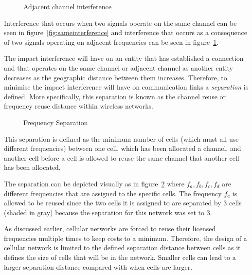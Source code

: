 \begin{figure}[bp!]
	\begin{centering}
	
	\label{fig:adjacentinterference}
	\caption{Adjacent channel interference}
	\end{centering}
\end{figure}
Interference that occurs when two signals operate on the same channel can be seen in figure~\ref{fig:sameinterference} and interference that occurs as a consequence of two signals operating on adjacent frequencies can be seen in figure~\ref{fig:adjacentinterference}.

The impact interference will have on an entity that has established a connection and that operates on the same channel or adjacent channel as another entity decreases as the geographic distance between them increases\cite{InterferenceOrientatedFAP}. Therefore, to minimise the impact interference will have on communication links a \emph{separation} is defined\cite{WirelessCommunications}. More specifically, this separation is known as the channel reuse or frequency reuse distance within wireless networks\cite{WirelessCommunications}.

\begin{figure}[t!]
	\begin{centering}
	
	\caption{Frequency Separation}
	\label{fig:seperationgraph}
	\end{centering}
\end{figure}

This separation is defined as the minimum number of cells (which must all use different frequencies) between one cell, which has been allocated a channel, and another cell before a cell is allowed to reuse the same channel that another cell has been allocated\cite{WirelessCommunications,InterferenceOrientatedFAP}. 

The separation can be depicted visually as in figure~\ref{fig:seperationgraph} where $f_a,f_b,f_c,f_d$ are different frequencies that are assigned to the specific cells. The frequency $f_a$ is allowed to be reused since the two cells it is assigned to are separated by 3 cells (shaded in gray) because the separation for this network was set to 3.

As discussed earlier, cellular networks are forced to reuse their licensed frequencies multiple times to keep costs to a minimum. Therefore, the design of a cellular network is limited to the defined separation distance between cells as it defines the size of cells that will be in the network\cite{Eisenblatter,InterferenceOrientatedFAP}. Smaller cells can lead to a larger separation distance compared with when cells are larger\cite{WirelessCommunications,WirelessDigitalCommunications}.

